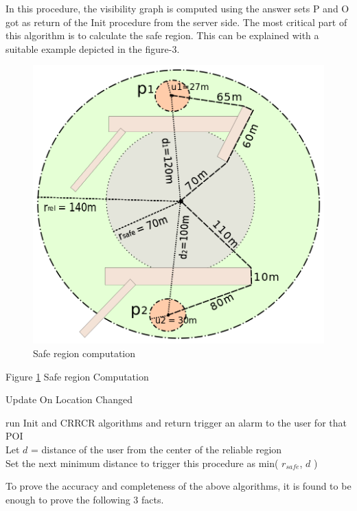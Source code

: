 \documentclass{sig-alternate}
\begin{document}
In this procedure, the visibility graph is computed using the answer sets P and O got as return of the Init procedure from the server side. The most critical part of this algorithm is to calculate the safe region. This can be explained with a suitable example depicted in the figure-3.
\begin{figure}
  \includegraphics[width=\linewidth]{safe_region.png}
  \caption{Safe region computation}
  \label{fig:safe_region}
\end{figure} 
Figure \ref{fig:safe_region} Safe region Computation


\begin{algorithm}
\caption{Update On Location Changed}
\label{ULC}
\begin{algorithmic}[2]
  \State run Init and CRRCR algorithms and return
  \EndIf
{}
\EndIf
{}\State trigger an alarm to the user for that POI
\EndIf
\\Let $d$ = distance of the user from the center of the reliable region
\\Set the next minimum distance to trigger this procedure as min( $r_{safe}$, $d$ )

\EndProcedure
\end{algorithmic}
\end{algorithm}
To prove the accuracy and completeness of the above algorithms, it is found to be enough to prove the following 3 facts.\\
\end{document}
